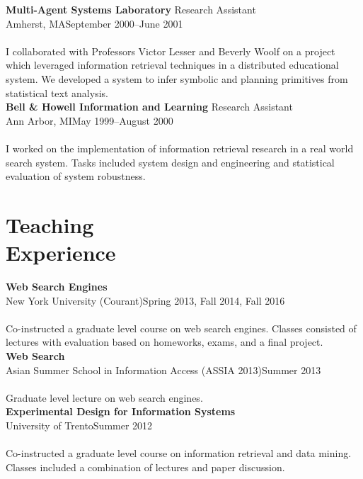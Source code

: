 \documentclass{article}
\begin{document}
\noindent\textbf{Multi-Agent Systems Laboratory }\hfill Research Assistant\\
Amherst, MA\hfill  September 2000–June 2001\\\\
I collaborated with Professors Victor Lesser and Beverly Woolf on a project which leveraged information retrieval techniques in a distributed educational system. We developed a system to infer symbolic and planning primitives from statistical text analysis.\\

\noindent\textbf{Bell \& Howell Information and Learning }\hfill Research Assistant\\
Ann Arbor, MI\hfill  May 1999–August 2000\\\\
I worked on the implementation of information retrieval research in a real world search system. Tasks included system design and engineering and statistical evaluation of system robustness.\\


\section{Teaching \\Experience}\noindent\textbf{Web Search Engines} \\
New York University (Courant)\hfill Spring 2013, Fall 2014, Fall 2016\\\\
Co-instructed a graduate level course on web search engines.  Classes consisted of lectures with evaluation based on homeworks, exams, and a final project. \\

\noindent\textbf{Web Search} \\
Asian Summer School in Information Access (ASSIA 2013)\hfill Summer 2013\\\\
Graduate level lecture on web search engines.  \\


\noindent\textbf{Experimental Design for Information Systems} \\
University of Trento\hfill Summer 2012\\\\
Co-instructed a graduate level course on information retrieval and data mining.  Classes included a combination of lectures and paper discussion. \\
\end{document}
